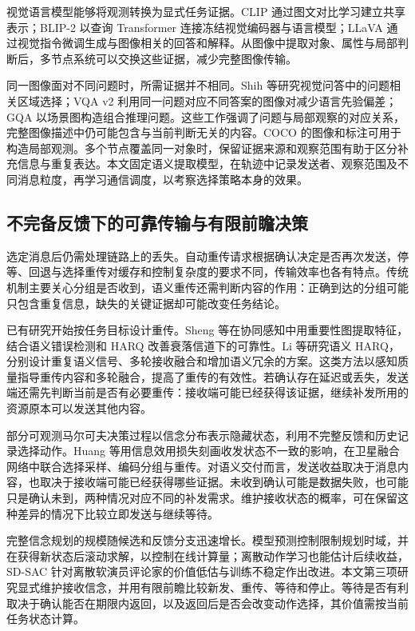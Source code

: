 视觉语言模型能够将观测转换为显式任务证据。CLIP 通过图文对比学习建立共享表示\cite{clip}；BLIP-2 以查询 Transformer 连接冻结视觉编码器与语言模型\cite{blip2}；LLaVA 通过视觉指令微调生成与图像相关的回答和解释\cite{llava}。从图像中提取对象、属性与局部判断后，多节点系统可以交换这些证据，减少完整图像传输。

同一图像面对不同问题时，所需证据并不相同。Shih 等研究视觉问答中的问题相关区域选择\cite{where-to-look-vqa}；VQA v2 利用同一问题对应不同答案的图像对减少语言先验偏差\cite{vqa-v2}；GQA 以场景图构造组合推理问题\cite{gqa}。这些工作强调了问题与局部观察的对应关系，完整图像描述中仍可能包含与当前判断无关的内容。COCO 的图像和标注可用于构造局部观测\cite{coco}。多个节点覆盖同一对象时，保留证据来源和观察范围有助于区分补充信息与重复表达。本文固定语义提取模型，在轨迹中记录发送者、观察范围及不同消息粒度，再学习通信调度，以考察选择策略本身的效果。

\subsection{不完备反馈下的可靠传输与有限前瞻决策}

选定消息后仍需处理链路上的丢失。自动重传请求根据确认决定是否再次发送，停等、回退与选择重传对缓存和控制复杂度的要求不同，传输效率也各有特点\cite{lin1984arq}。传统机制主要关心分组是否收到，语义重传还需判断内容的作用：正确到达的分组可能只包含重复信息，缺失的关键证据却可能改变任务结论。

已有研究开始按任务目标设计重传。Sheng 等在协同感知中用重要性图提取特征，结合语义错误检测和 HARQ 改善衰落信道下的可靠性\cite{sheng2024harq}。Li 等研究语义 HARQ，分别设计重复语义信号、多轮接收融合和增加语义冗余的方案\cite{li2025semharq}。这类方法以感知质量指导重传内容和多轮融合，提高了重传的有效性。若确认存在延迟或丢失，发送端还需先判断当前是否有必要重传：接收端可能已经获得该证据，继续补发所用的资源原本可以发送其他内容。

部分可观测马尔可夫决策过程以信念分布表示隐藏状态，利用不完整反馈和历史记录选择动作\cite{kaelbling1998pomdp}。Huang 等用信息效用损失刻画收发状态不一致的影响，在卫星融合网络中联合选择采样、编码分组与重传\cite{uoi2024satellite}。对语义交付而言，发送收益取决于消息内容，也取决于接收端可能已经获得哪些证据。未收到确认可能是数据失败，也可能只是确认未到，两种情况对应不同的补发需求。维护接收状态的概率，可在保留这种差异的情况下比较立即发送与继续等待。

完整信念规划的规模随候选和反馈分支迅速增长。模型预测控制限制规划时域，并在获得新状态后滚动求解，以控制在线计算量\cite{mayne2000mpc}；离散动作学习也能估计后续收益，SD-SAC 针对离散软演员评论家的价值低估与训练不稳定作出改进\cite{zhou2024sdsac}。本文第三项研究显式维护接收信念，并用有限前瞻比较新发、重传、等待和停止。等待是否有利取决于确认能否在期限内返回，以及返回后是否会改变动作选择，其价值需按当前任务状态计算。

